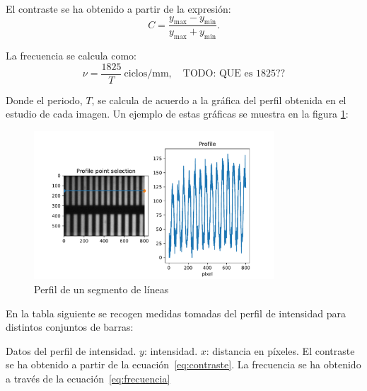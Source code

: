 \documentclass{./packages/optica-article}
\begin{document}
El contraste se ha obtenido a partir de la expresión:
\nopagebreak
\begin{equation}
	C = \frac{y_{\max} - y_{\min}}{y_{\max} + y_{\min}}.
	\label{eq:contraste}
\end{equation}

La frecuencia se calcula como:
\nopagebreak
\begin{equation}
	\nu = \frac{1825}{T}\ \textrm{ciclos/mm},\quad\textrm{TODO: QUE es 1825??}\label{eq:frecuencia}
\end{equation}

Donde el periodo, $T$, se calcula de acuerdo a la gráfica del perfil obtenida en el estudio de cada imagen. Un ejemplo de estas gráficas se muestra en la figura \ref{fig:perfil:example}:

\begin{figure}[!h]
	\includegraphics[width=0.8\textwidth]{profile-lines.pdf}
	\caption{Perfil de un segmento de líneas}\label{fig:perfil:example}
\end{figure}


En la tabla siguiente se recogen medidas tomadas del perfil de intensidad para distintos conjuntos de barras:

\begin{table}[h]
	\centering
	\caption{Datos del perfil de intensidad. $y$: intensidad. $x$: distancia en píxeles. El contraste se ha obtenido a partir de la ecuación~\ref{eq:contraste}. La frecuencia se ha obtenido a través de la ecuación~\ref{eq:frecuencia}}%
	\label{table:perfilintensidad}
\end{table}
\end{document}
